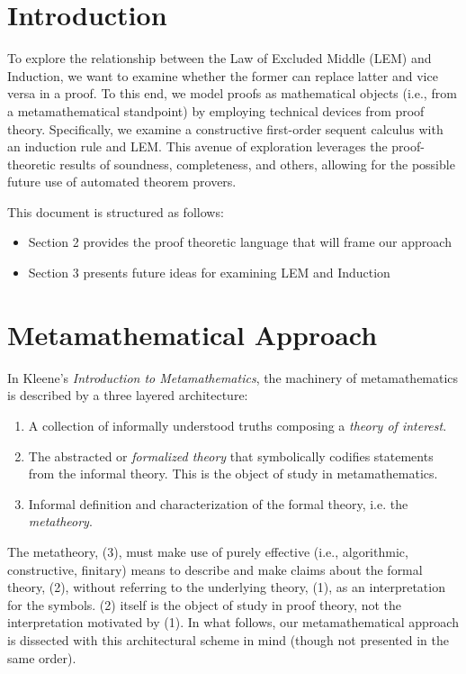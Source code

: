 \documentclass{article}
\begin{document}
\section{Introduction}

To explore the relationship between the Law of
Excluded Middle (LEM) and Induction, we want to examine whether the former can
replace latter and vice versa in a proof. To this end, we model proofs
as mathematical objects (i.e., from a metamathematical standpoint) by
employing technical devices from proof theory. Specifically, we
examine a constructive first-order sequent calculus with an induction rule and LEM. This avenue of exploration leverages the proof-theoretic results of soundness, completeness, and others, allowing for the possible future use of
automated theorem provers.

This document is structured as follows:
\begin{itemize}
\item Section 2 provides the proof theoretic language that will frame our approach
\item Section 3 presents future ideas for examining LEM and Induction
\end{itemize}


\section{Metamathematical Approach}

In Kleene's \textit{Introduction to Metamathematics}, the machinery of metamathematics is described by a three layered architecture:
\begin{enumerate}
\item A collection of informally understood truths composing a \textit{theory of interest}.
\item The abstracted or \textit{formalized theory} that symbolically codifies statements from the informal theory. This is the object of study in metamathematics.
\item Informal definition and characterization of the formal theory, i.e. the \textit{metatheory}.
\end{enumerate}

The metatheory, (3), must make use of purely effective (i.e., algorithmic, constructive, finitary) means to describe and make claims about the formal theory, (2), without referring to the underlying theory, (1), as an interpretation for the symbols. (2) itself is the object of study in proof theory, not the interpretation motivated by (1). In what follows, our metamathematical approach is dissected with this architectural scheme in mind (though not presented in the same order).
\end{document}
